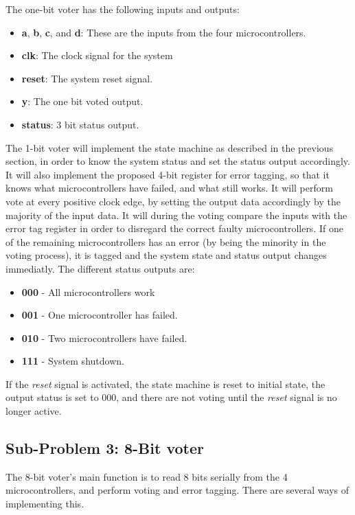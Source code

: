 \documentclass[a4paper]{IEEEtran}
\begin{document}
The one-bit voter has the following inputs and outputs:
\begin{itemize}
    \item \textbf{a}, \textbf{b}, \textbf{c}, and \textbf{d}: These are the inputs from the four microcontrollers.
    \item \textbf{clk}: The clock signal for the system
    \item \textbf{reset}: The system reset signal.
    \item \textbf{y}: The one bit voted output.
    \item \textbf{status}: 3 bit status output.
\end{itemize}

The 1-bit voter will implement the state machine as described in the previous section, in order to know the system status and set the status output accordingly.
It will also implement the proposed 4-bit register for error tagging, so that it knows what microcontrollers have failed, and what still works.
It will perform vote at every positive clock edge, by setting the output data accordingly by the majority of the input data.
It will during the voting compare the inputs with the error tag register in order to disregard the correct faulty microcontrollers.
If one of the remaining microcontrollers has an error (by being the minority in the voting process), it is tagged and the system state and status output changes immediatly.
The different status outputs are:
\begin{itemize}
    \item \textbf{000} - All microcontrollers work
    \item \textbf{001} - One microcontroller has failed.
    \item \textbf{010} - Two microcontrollers have failed.
    \item \textbf{111} - System shutdown.
\end{itemize}
If the \textit{reset} signal is activated, the state machine is reset to initial state, the output status is set to 000, and there are not voting until the \textit{reset} signal is no longer active. 

\subsection{Sub-Problem 3: 8-Bit voter}

The 8-bit voter's main function is to read 8 bits serially from the 4 microcontrollers, and perform voting and error tagging. 
There are several ways of implementing this.
\end{document}
